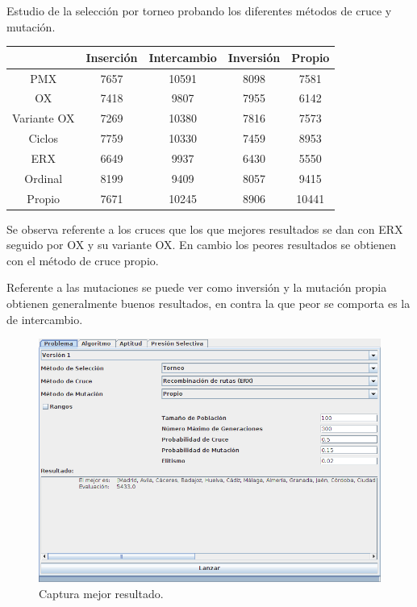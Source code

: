 \documentclass[12pt]{article}
\begin{document}
Estudio de la selección por torneo probando los diferentes métodos de cruce y mutación.

\begin{table}[H]
\begin{center}
\begin{tabular}{|ccccc|} \hline
	   & Inserción & Intercambio & Inversión & Propio \\  \hline
PMX 	   &  7657 & 10591 & 8098 & 7581 \\ 
OX 	   & 7418 & 9807 & 7955 & 6142  \\ 
Variante OX & 7269 & 10380 & 7816 & 7573 \\
Ciclos 	   & 7759 & 10330 & 7459 & 8953 \\
ERX 	   & 6649 & 9937 & 6430 & 5550 \\
Ordinal    & 8199 & 9409 & 8057 & 9415 \\
Propio     & 7671 & 10245 & 8906 & 10441 \\  \hline
\end{tabular}
\end{center}
\end{table}

	Se observa referente a los cruces que los que mejores resultados se dan con ERX seguido por OX y su variante OX. En cambio los peores resultados se obtienen con el método de cruce propio.

	Referente a las mutaciones se puede ver como inversión y la mutación propia obtienen generalmente buenos resultados, en contra la que peor se comporta es la de intercambio.

\begin{figure}[H]
\centering
\includegraphics[scale=0.4]{graficas/fig1}
\caption{Captura mejor resultado.}
\label{fig}
\end{figure}
\end{document}
